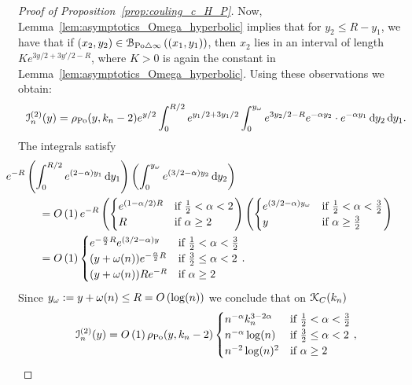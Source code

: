 \begin{proof}[Proof of Proposition~\ref{prop:couling_c_H_P}]
Now, Lemma~\ref{lem:asymptotics_Omega_hyperbolic} implies that for 
$y_2 \leq R -y_1$, we have that if 
$(x_2,y_2) \in {\mathcal B}_{{\mathrm{Po}} \bigtriangleup \infty}\left((x_1,y_1)\right)$, then $x_2$ lies in an interval of length 
$Ke^{3 y/2 + 3y'/2 - R}$, where $K >0$ is again the constant in Lemma~\ref{lem:asymptotics_Omega_hyperbolic}. 
Using these observations we obtain: 
\begin{equation} \label{eq:term2_intermediate}
	\mathcal{I}_n^{(2)}(y) = \rho_{{\mathrm{Po}}}(y,k_n-2) e^{y/2}\int_0^{R/2} e^{y_1/2 + 3y_1/2}
	\int_0^{y_\omega} e^{3y_2/2 - R} e^{-\alpha y_2} \cdot e^{-\alpha y_1} \operatorname{\mathrm{d}\hspace{-2pt}} y_2 \operatorname{\mathrm{d}\hspace{-2pt}} y_1. 
\end{equation} 
The integrals satisfy
\begin{align*}
	&\hspace{-30pt} e^{-R}  \left(\int_0^{R/2} e^{(2-\alpha )y_1} \dd y_1\right) 
		\left( \int_0^{y_\omega} e^{(3/2 - \alpha) y_2} \dd y_2 \right)\\
	&= \bigO{1} e^{-R} \left(\begin{cases}
		e^{(1-\alpha/2)R} &\mbox{if } \frac{1}{2} < \alpha < 2\\
		R &\mbox{if } \alpha \ge 2
	\end{cases}\right)
	\left(\begin{cases}
		e^{(3/2 - \alpha)y_\omega} &\mbox{if } \frac{1}{2} < \alpha < \frac{3}{2}\\
		y &\mbox{if } \alpha \ge \frac{3}{2}
	\end{cases}\right)\\
	&= \bigO{1} \begin{cases}
		e^{-\frac{\alpha}{2}R} e^{(3/2 - \alpha)y} &\mbox{if } \frac{1}{2} < \alpha < \frac{3}{2}\\
		(y +\omega(n)) e^{-\frac{\alpha}{2} R} &\mbox{if } \frac{3}{2} \le \alpha < 2\\
		(y + \omega(n)) R e^{-R} &\mbox{if } \alpha \ge 2
	\end{cases}.
\end{align*}
Since $y_\omega := y + \omega(n) \le R = O\left(\log(n)\right)$ we conclude that on ${\mathcal K}_{C}(k_n)$
\[
	\mathcal{I}_n^{(2)}(y) = O\left(1\right) \rho_{{\mathrm{Po}}}(y,k_n-2) \begin{cases}
				n^{-\alpha} k_n^{3 - 2\alpha} &\mbox{if } \frac{1}{2} < \alpha < \frac{3}{2}\\
				n^{-\alpha} \log(n) &\mbox{if } \frac{3}{2} \le \alpha < 2\\
				n^{-2} \log(n)^{2} &\mbox{if } \alpha \ge 2
		\end{cases},
\]
\end{proof}
